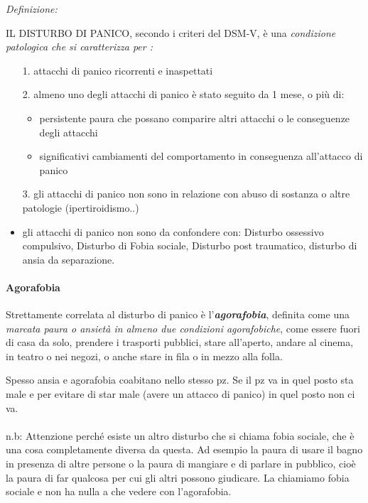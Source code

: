 \emph{\emph{Definizione:}}

IL DISTURBO DI PANICO, secondo i criteri del DSM-V, è una
\emph{condizione patologica che si caratterizza per :}

\begin{itemize}
\item[1.]
  attacchi di panico ricorrenti e inaspettati
\item[2.]
  almeno uno degli attacchi di panico è stato seguito da 1 mese, o più
  di:

\begin{itemize}
\item
  persistente paura che possano comparire altri attacchi o le
  conseguenze degli attacchi
\item
  significativi cambiamenti del comportamento in conseguenza all'attacco
  di panico
\end{itemize}

\item[3.]
  gli attacchi di panico non sono in relazione con abuso di sostanza o
  altre patologie (ipertiroidismo..)
\item
  gli attacchi di panico non sono da confondere con: Disturbo ossessivo
  compulsivo, Disturbo di Fobia sociale, Disturbo post traumatico,
  disturbo di ansia da separazione.
\end{itemize}

\paragraph{Agorafobia}

Strettamente correlata al disturbo di panico è
l'\textbf{\emph{agorafobia}}, definita come una \emph{marcata paura o
ansietà in almeno due condizioni agorafobiche}, come essere fuori di
casa da solo, prendere i trasporti pubblici, stare all'aperto, andare al
cinema, in teatro o nei negozi, o anche stare in fila o in mezzo alla
folla.

Spesso ansia e agorafobia coabitano nello stesso pz. Se il pz va in quel
posto sta male e per evitare di star male (avere un attacco di panico)
in quel posto non ci va.
\\\\
n.b: Attenzione perché esiste un altro disturbo che si chiama fobia
sociale, che è una cosa completamente diversa da questa. Ad esempio la
paura di usare il bagno in presenza di altre persone o la paura di
mangiare e di parlare in pubblico, cioè la paura di far qualcosa per cui
gli altri possono giudicare. La chiamiamo fobia sociale e non ha nulla a
che vedere con l'agorafobia.

